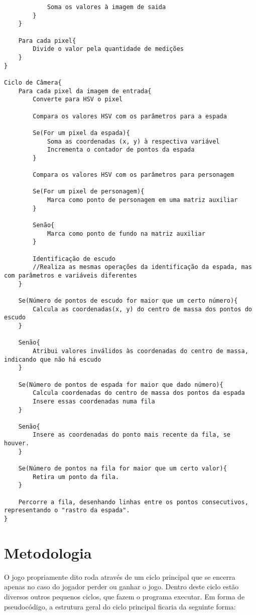 \documentclass[12pt]{sciposter}
\begin{document}
\begin{multicols}{3}
\begin {lstlisting}
            Soma os valores à imagem de saida
        }
    }
    
    Para cada pixel{
        Divide o valor pela quantidade de medições
    }
}

Ciclo de Câmera{
    Para cada pixel da imagem de entrada{
        Converte para HSV o pixel
        
        Compara os valores HSV com os parâmetros para a espada
        
        Se(For um pixel da espada){
            Soma as coordenadas (x, y) à respectiva variável
            Incrementa o contador de pontos da espada
        }
        
        Compara os valores HSV com os parâmetros para personagem
        
        Se(For um pixel de personagem){
            Marca como ponto de personagem em uma matriz auxiliar
        }
        
        Senão{
            Marca como ponto de fundo na matriz auxiliar
        }
        
        Identificação de escudo
        //Realiza as mesmas operações da identificação da espada, mas com parâmetros e variáveis diferentes
    }
    
    Se(Número de pontos de escudo for maior que um certo número){
        Calcula as coordenadas(x, y) do centro de massa dos pontos do escudo
    }
    
    Senão{
        Atribui valores inválidos às coordenadas do centro de massa, indicando que não há escudo
    }
    
    Se(Número de pontos de espada for maior que dado número){
        Calcula coordenadas do centro de massa dos pontos da espada
        Insere essas coordenadas numa fila
    }
    
    Senão{
        Insere as coordenadas do ponto mais recente da fila, se houver.
    }
    
    Se(Número de pontos na fila for maior que um certo valor){
        Retira um ponto da fila.
    }
    
    Percorre a fila, desenhando linhas entre os pontos consecutivos, representando o "rastro da espada".
}
\end{lstlisting}

\section{Metodologia}

O jogo propriamente dito roda através de um ciclo principal que se encerra apenas no caso do jogador perder ou ganhar o jogo. Dentro deste ciclo estão diversos outros pequenos ciclos, que fazem o programa executar. Em forma de pseudocódigo, a estrutura geral do ciclo principal ficaria da seguinte forma:



\end{multicols}
\end{document}
